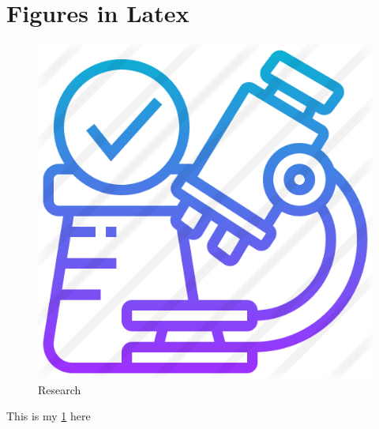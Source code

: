 \section{Figures in Latex}
\begin{figure}[!h]%
\begin{center}
  \includegraphics[scale=0.6]{figs/research.png} %
  \caption{Research}
  \label{fig:Research}
\end{center}
\end{figure}
This is my \ref{fig:Research} here
